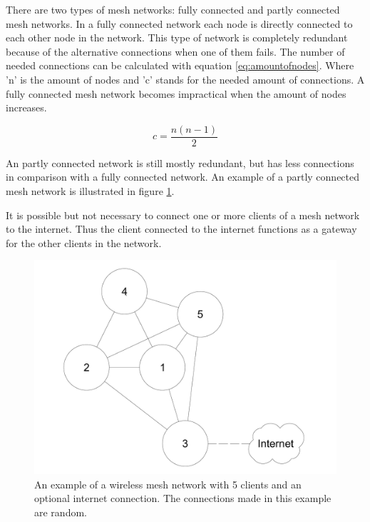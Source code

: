 \documentclass[10pt,a4paper]{article}
\begin{document}
There are two types of mesh networks: fully connected and partly connected mesh networks. In a fully connected network each node is directly connected to each other node in the network. This type of network is completely redundant because of the alternative connections when one of them fails. The number of needed connections can be calculated with equation \ref{eq:amountofnodes}\cite{combook}. Where 'n' is the amount of nodes and 'c' stands for the needed amount of connections. A fully connected mesh network becomes impractical when the amount of nodes increases.

\begin{equation}
c=\frac{n(n-1)}{2}
\label{eq:amountofnodes}
\end{equation}

An partly connected network is still mostly redundant, but has less connections in comparison with a fully connected network. An example of a partly connected mesh network is illustrated in figure \ref{fig:WMN}. \cite{combook} 

It is possible but not necessary to connect one or more clients of a mesh network to the internet. Thus the client connected to the internet functions as a gateway for the other clients in the network. \cite{wirelessmeshnetworksopportunitiesandchallenges}

\begin{figure}[H]
   \centering
   \includegraphics[width=1\textwidth]{WMN}
   \caption{An example of a wireless mesh network with 5 clients and an optional internet connection. The connections made in this example are random.}
   \label{fig:WMN}
\end{figure}
\end{document}
